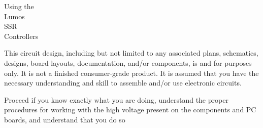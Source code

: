 \documentclass[letterpaper,twoside,onecolumn,openright,final]{memoir}
\begin{document}
  \def\lightstate#1#2#3{%
    \ifthenelse{\equal{#1}{on}}{\draw [thick] (#2,\y+#3) circle (.1);}{%
      \ifthenelse{\equal{#1}{off}}{\draw [thick, fill, color=gray] (#2,\y+#3) circle (.1);}{%
        \ifthenelse{\equal{#1}{sfd}}{\draw [thick, dashed] (#2,\y+#3) circle (.1);}{%
          \ifthenelse{\equal{#1}{x}}{\draw [thick, fill, color=white] (#2,\y+#3) circle (.1);\draw (#2,\y+#3) -- +(-.1,-.1) -- +(.1,.1) -- +(0,0) -- +(-.1,.1) -- +(.1,-.1);}{%
            \ifthenelse{\equal{#1}{sfl}}{\draw [thick, dotted] (#2,\y+#3) circle (.1);}{%
              \ifthenelse{\equal{#1}{ffl}}{\draw [thick, dotted] (#2,\y+#3) circle (.1);\draw [thick] (#2,\y+#3) circle (.05);}{%
                \ifthenelse{\equal{#1}{blk}}{\draw [thick] (#2,\y+#3) circle (.1); \draw [thick] (#2,\y+#3) -- +(-.1,0) -- +(.1,0) -- +(0,0) -- +(0,-.1) -- +(0,.1);}{%
                  \ifthenelse{\equal{#1}{ffd}}{\draw [thick, dashed] (#2,\y+#3) circle (.1); \draw [thick] (#2,\y+#3) circle (.05);}{%
                    \ifthenelse{\equal{#1}{sss}}{\draw [thick, dashed] (#2,\y+#3) circle (.1); \draw [thick] (#2,\y+#3) circle (.02);}{%
 		    }%
		  }%
	        }%
  	      }%
 	    }%
 	  }%
  	}%
      }%
    }%
  }%

\thispagestyle{empty}
\begin{center}
{\fontsize{48}{50}\selectfont
Using the\\Lumos\TM\\SSR\\Controllers\\\strut
}

\vfill

\end{center}

\newpage
\begin{center}


\end{center}

This circuit design, including but not limited to any associated plans, schematics, designs, board layouts, documentation, 
and/or components, is  and for  purposes only. It is not a finished consumer-grade product.
It is assumed that you have the necessary understanding and skill to assemble and/or use electronic circuits.

Proceed  if you know exactly what you are doing, understand the proper procedures for working with the high voltage present on the components and PC boards, and understand that you do so 
\end{document}

